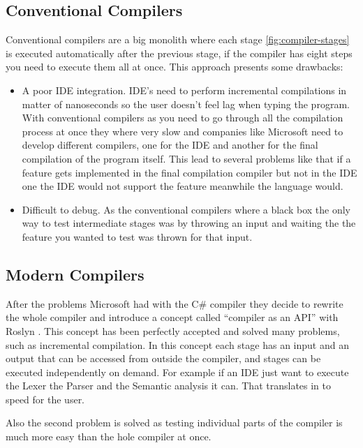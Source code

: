 \subsection{Conventional Compilers}
Conventional compilers are a big monolith where each stage \ref{fig:compiler-stages} is executed automatically after the
previous stage, if the compiler has eight steps you need to execute them all at once. This approach presents some drawbacks:
\begin{itemize}
    \item A poor IDE \cite{ide} integration. IDE’s need to perform incremental compilations in matter of nanoseconds so
    the user doesn’t feel lag when typing the program. With conventional compilers as you need to go through all the compilation
    process at once they where very slow and companies like Microsoft need to develop different compilers, one for the IDE and
    another for the final compilation of the program itself. This lead to several problems like that if a feature gets
    implemented in the final compilation compiler but not in the IDE one the IDE would not support the feature meanwhile
    the language would.
    \item Difficult to debug. As the conventional compilers where a black box the only way to test intermediate stages was
    by throwing an input and waiting the the feature you wanted to test was thrown for that input.
\end{itemize}

\subsection{Modern Compilers}
After the problems Microsoft had with the C\# compiler they decide to rewrite the whole compiler and introduce a concept
called “compiler as an API” with Roslyn \cite{dotNet}. This concept has been perfectly accepted and solved many problems,
such as incremental compilation.
In this concept each stage has an input and an output that can be accessed from outside the compiler, and stages can be
executed independently on demand. For example if an IDE just want to execute the Lexer the Parser and
the Semantic analysis it can. That translates in to speed for the user.

Also the second problem is solved as testing individual parts of the compiler is much more easy than the hole compiler
at once.
